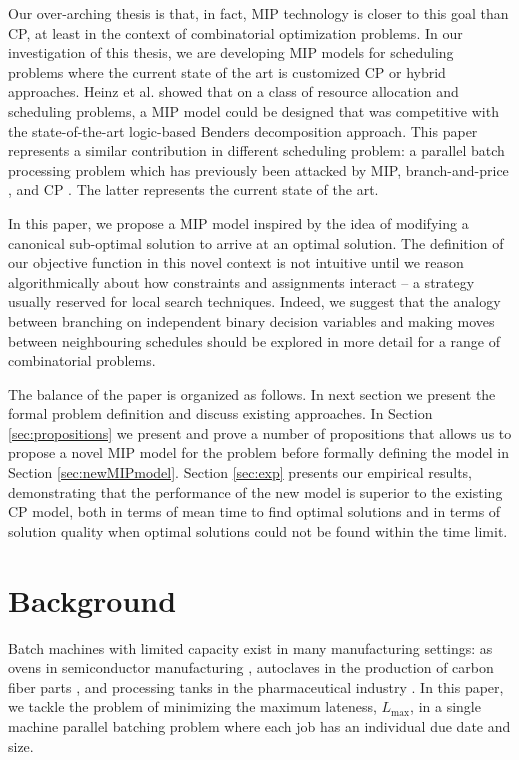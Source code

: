 \documentclass[oribibl]{llncs}
\def\Lmax{{L_{\mathrm{max}}}}
\begin{document}
Our over-arching thesis is that, in fact, MIP technology is closer to
this goal than CP, at least in the context of combinatorial optimization
problems. In our investigation of this thesis, we are developing MIP
models for scheduling problems where the current state of the art is
customized CP or hybrid approaches. Heinz et al. \cite{Heinz} showed
that on a class of resource allocation and scheduling problems, a MIP
model could be designed that was competitive with the state-of-the-art
logic-based Benders decomposition approach. This paper represents a
similar contribution in different scheduling problem: a parallel batch
processing problem which has previously been attacked by MIP,
branch-and-price \cite{Daste1}, and CP \cite{Malapert}. The latter represents
the current state of the art.

In this paper, we propose a MIP model inspired by the idea of modifying
a canonical sub-optimal solution to arrive at an optimal solution.
The definition of our objective function in this novel context is not
intuitive until we reason algorithmically about how constraints and
assignments interact -- a strategy usually reserved for local search
techniques. Indeed, we suggest that the analogy between branching
on independent binary decision variables and making moves between
neighbouring schedules should be explored in more detail for a range of
combinatorial problems.

The balance of the paper is organized as follows. In next section we
present the formal problem definition and discuss existing approaches.
In Section \ref{sec:propositions} we present and
prove a number of propositions that allows us to propose a novel MIP
model for the problem before formally defining the model in Section
\ref{sec:newMIPmodel}. Section \ref{sec:exp} presents our empirical
results, demonstrating that the performance of the new model is superior
to the existing CP model, both in terms of mean time to find optimal solutions
and in terms of solution quality when optimal solutions could not be found
within the time limit.

\section{Background}
\label{sec:background}

Batch machines with limited capacity exist in many manufacturing
settings: as ovens in semiconductor manufacturing \cite{Lee}, autoclaves
in the production of carbon fiber parts \cite{Malapert}, and processing
tanks in the pharmaceutical industry \cite{Grossmann}. In this paper,
we tackle the problem of minimizing the maximum lateness, $\Lmax$,
in a single machine parallel batching problem where each job has an
individual due date and size.
\end{document}
